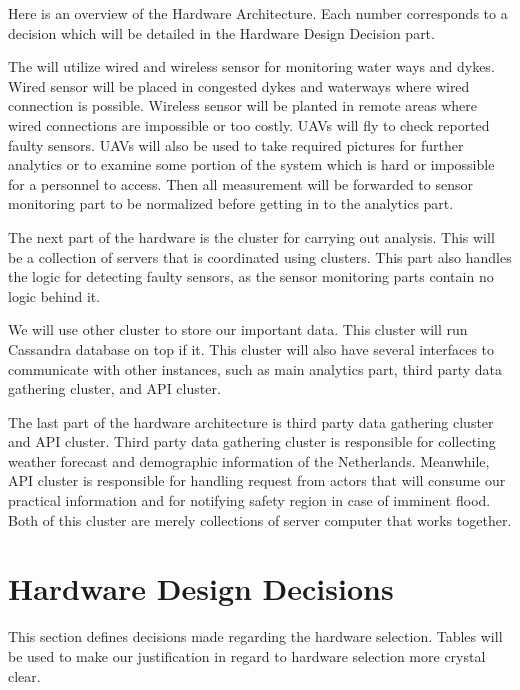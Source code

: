 Here is an overview of the Hardware Architecture. Each number corresponds to a decision which will be detailed in the Hardware Design Decision part.

The \ProjectName{} will utilize wired and wireless sensor for monitoring water ways and dykes. Wired sensor will be placed in congested dykes and waterways where wired connection is possible. Wireless sensor will be planted in remote areas where wired connections are impossible or too costly. UAVs will fly to check reported faulty sensors. UAVs will also be used to take required pictures for further analytics or to examine some portion of the system which is hard or impossible for a personnel to access. Then all measurement will be forwarded to sensor monitoring part to be normalized before getting in to the analytics part.

The next part of the hardware is the cluster for carrying out analysis. This will be a collection of servers that is coordinated using clusters. This part also handles the logic for detecting faulty sensors, as the sensor monitoring parts contain no logic behind it.

We will use other cluster to store our important data. This cluster will run Cassandra database on top if it. This cluster will also have several interfaces to communicate with other instances, such as main analytics part, third party data gathering cluster, and API cluster.

The last part of the hardware architecture is third party data gathering cluster and API cluster. Third party data gathering cluster is responsible for collecting weather forecast and demographic information of the Netherlands. Meanwhile, API cluster is responsible for handling request from actors that will consume our practical information and for notifying safety region in case of imminent flood. Both of this cluster are merely collections of server computer that works together.

\section{Hardware Design Decisions}
\label{sec:hardware-decisions}
This section defines decisions made regarding the hardware selection. Tables will be used to make our justification in regard to hardware selection more crystal clear.

